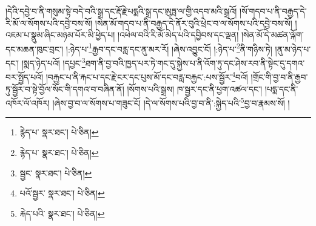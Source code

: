 །དེའི་དབྱེ་བ་ནི་གསུམ་སྟེ་བདེ་བའི་སྒྲ་དང་རྡོ་རྗེ་པདྨའི་སྒྲ་དང་ཨུཏྤ་ལ་གྱི་འདབ་མའི་སྒྲའོ། །སོ་གདབ་པ་ནི་བརྒྱད་དེ་རི་མོ་ལ་སོགས་པའི་དབྱེ་བས་སོ། །སེན་མོ་གདབ་པ་ནི་བརྒྱད་དེ་ནོར་བུའི་ཕྲེང་བ་ལ་སོགས་པའི་དབྱེ་བས་སོ། །འཇམ་པ་སྣུམ་ཞིང་མཉམ་པོར་མི་ཕྱེད་པ། །འཕེལ་བའི་རི་མོ་མེད་པའི་དབྱིབས་དང་ལྡན། །སེན་མོ་དེ་མཚན་ལྐོག་དང་མཆན་ཁུང་བྲང་། །:ཉེད་པ་\footnote{རྙེད་པ་  སྣར་ཐང་།  པེ་ཅིན། }རྒྱབ་དང་བརླ་དང་ནུ་མར་རོ། །ཞེས་འབྱུང་ངོ། །:ཉེད་པ་\footnote{རྙེད་པ་  སྣར་ཐང་།  པེ་ཅིན། }ནི་གཉིས་ཏེ། །ནུ་མ་ཉེད་པ་དང་། །སྨད་ཉེད་པའོ། །དཔྱང་\footnote{སྦྱང་  སྣར་ཐང་།  པེ་ཅིན། }ཐག་ནི་བྱ་བའི་ཁྱད་པར་ཏེ་གང་དུ་སྐྱེས་པ་ནི་འོག་ཏུ་དང་ཤེས་རབ་ནི་སྟེང་དུ་དགའ་བར་སྤྱོད་པའོ། །བརྐྱང་པ་ནི་རྐང་པ་དང་རྗེ་ངར་དང་པུས་མོ་དང་བརླ་བརྐྱང་:པས་སྦྱོར་\footnote{པའོ་སྦྱར་  སྣར་ཐང་།  པེ་ཅིན། }བའོ། །གྲོང་གི་བྱ་བ་ནི་རྒྱབ་ཏུ་སྦྱོར་བ་སྟེ་བྱོལ་སོང་གི་དགའ་བ་བཞིན་ནོ། །སོགས་པའི་སྒྲས། ཁ་སྦྱར་དང་ནི་ཕྱག་འཚལ་དང་། །པདྨ་དང་ནི་འཁོར་ལོ་འཁོར། །ཞེས་བྱ་བ་ལ་སོགས་པ་གཟུང་ངོ། །དེ་ལ་སོགས་པའི་བྱ་བ་ནི་:སྐྱེད་པའི་\footnote{རྐེད་པའི་  སྣར་ཐང་།  པེ་ཅིན། }བྱ་བ་རྣམས་སོ། །
